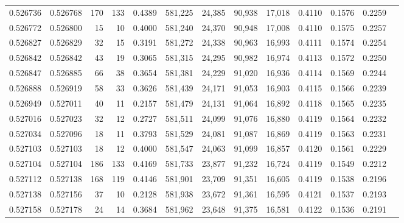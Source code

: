 \begin{tabular}{rrrrrrrrrrrrr}
0.526736 & 0.526768 &   170 &   133 &                                     0.4389 & 581,225 &  24,385 &  90,938 &  17,018 & 0.4110 & 0.1576 & 0.2259 \\
0.526772 & 0.526800 &    15 &    10 &                                     0.4000 & 581,240 &  24,370 &  90,948 &  17,008 & 0.4110 & 0.1575 & 0.2257 \\
0.526827 & 0.526829 &    32 &    15 &                                     0.3191 & 581,272 &  24,338 &  90,963 &  16,993 & 0.4111 & 0.1574 & 0.2254 \\
0.526842 & 0.526842 &    43 &    19 &                                     0.3065 & 581,315 &  24,295 &  90,982 &  16,974 & 0.4113 & 0.1572 & 0.2250 \\
0.526847 & 0.526885 &    66 &    38 &                                     0.3654 & 581,381 &  24,229 &  91,020 &  16,936 & 0.4114 & 0.1569 & 0.2244 \\
0.526888 & 0.526919 &    58 &    33 &                                     0.3626 & 581,439 &  24,171 &  91,053 &  16,903 & 0.4115 & 0.1566 & 0.2239 \\
0.526949 & 0.527011 &    40 &    11 &                                     0.2157 & 581,479 &  24,131 &  91,064 &  16,892 & 0.4118 & 0.1565 & 0.2235 \\
0.527016 & 0.527023 &    32 &    12 &                                     0.2727 & 581,511 &  24,099 &  91,076 &  16,880 & 0.4119 & 0.1564 & 0.2232 \\
0.527034 & 0.527096 &    18 &    11 &                                     0.3793 & 581,529 &  24,081 &  91,087 &  16,869 & 0.4119 & 0.1563 & 0.2231 \\
0.527103 & 0.527103 &    18 &    12 &                                     0.4000 & 581,547 &  24,063 &  91,099 &  16,857 & 0.4120 & 0.1561 & 0.2229 \\
0.527104 & 0.527104 &   186 &   133 &                                     0.4169 & 581,733 &  23,877 &  91,232 &  16,724 & 0.4119 & 0.1549 & 0.2212 \\
0.527112 & 0.527138 &   168 &   119 &                                     0.4146 & 581,901 &  23,709 &  91,351 &  16,605 & 0.4119 & 0.1538 & 0.2196 \\
0.527138 & 0.527156 &    37 &    10 &                                     0.2128 & 581,938 &  23,672 &  91,361 &  16,595 & 0.4121 & 0.1537 & 0.2193 \\
0.527158 & 0.527178 &    24 &    14 &                                     0.3684 & 581,962 &  23,648 &  91,375 &  16,581 & 0.4122 & 0.1536 & 0.2191 \\

\end{tabular}
